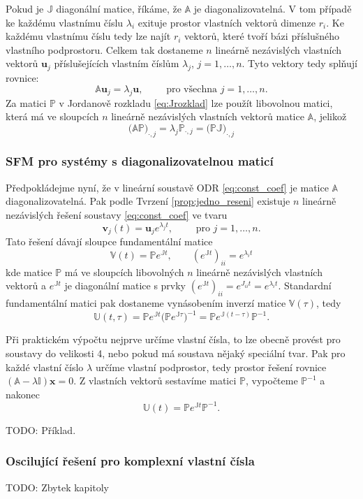 \documentclass[a4paper, 12pt]{book}
\theoremstyle{definition}
\def\vc#1{\mathbf{\boldsymbol{#1}}}     %
\def\tn#1{{\mathbb{#1}}}    %
\def\todo#1{{\color{green}TODO:} #1}
\begin{document}
Pokud je $\tn J$ diagonální matice, říkáme, že $\tn A$ je diagonalizovatelná. V tom případě ke každému vlastnímu číslu $\lambda_i$ exituje prostor vlastních vektorů dimenze $r_i$.
Ke každému vlastnímu číslu tedy lze najít $r_i$ vektorů, které tvoří bázi příslušného 
vlastního podprostoru. Celkem tak dostaneme $n$ lineárně nezávislých vlastních vektorů
$\vc u_j$ příslušejících vlastním číslům $\lambda_j$, $j=1,\dots, n$. Tyto vektory tedy splňují rovnice:
\[
   \tn A \vc u_j = \lambda_j \vc u, \qquad \text{ pro všechna } j=1,\dots, n.
\]
Za matici $\tn P$ v Jordanově rozkladu \eqref{eq:Jrozklad} lze použít libovolnou matici, která má ve sloupcích $n$ lineárně nezávislých vlastních vektorů matice $\tn A$, jelikož
\[
    \big( \tn A \tn P \big)_{\cdot, j} = \lambda_j \tn P_{\cdot, j} = \big(\tn P \tn J\big)_{\cdot, j}
\]    

\subsubsection{SFM pro systémy s diagonalizovatelnou maticí}
Předpokládejme nyní, že v lineární soustavě ODR \eqref{eq:const_coef} je matice $\tn A$ diagonalizovatelná.
Pak podle Tvrzení \eqref{prop:jedno_reseni}
existuje $n$ lineárně nezávislých řešení soustavy \eqref{eq:const_coef} ve tvaru 
\[
    \vc v_j(t)= \vc u_j e^{\lambda_j t},\qquad \text{ pro } j=1,\dots, n.
\]
Tato řešení dávají sloupce fundamentální matice
\[
    \tn V(t) = \tn P e^{\tn J t},\qquad (e^{\tn Jt})_{ii} = e^{\lambda_i t}
\]
kde matice $\tn P$ má ve sloupcích libovolných $n$ lineárně nezávislých vlastních vektorů
a $e^{\tn Jt}$ je diagonální matice s prvky $(e^{\tn Jt})_{ii} = e^{J_{ii} t} = e^{\lambda_i t}$. 
Standardní fundamentální matici pak dostaneme vynásobením inverzí matice $\tn V(\tau)$, tedy
\[
  \tn U(t, \tau) = \tn P e^{\tn J t} \big(\tn P e^{\tn J \tau} \big)^{-1} = \tn P e^{\tn J(t-\tau)} \tn P^{-1}.
\]

Při praktickém výpočtu nejprve určíme vlastní čísla, to lze obecně provést pro soustavy do velikosti 4, nebo pokud má soustava nějaký speciální tvar. 
Pak pro každé vlastní číslo $\lambda$ určíme vlastní podprostor, tedy prostor řešení rovnice $(\tn A -\lambda \tn I)\vc x= 0$. 
Z vlastních vektorů sestavíme matici $\tn P$, vypočteme $\tn P^{-1}$ a nakonec
\[
    \tn U(t) = \tn P e^{\tn J t} \tn P^{-1}.
\]

\todo{Příklad.}

\subsubsection{Oscilující řešení pro komplexní vlastní čísla}
\todo{Zbytek kapitoly}
\end{document}
